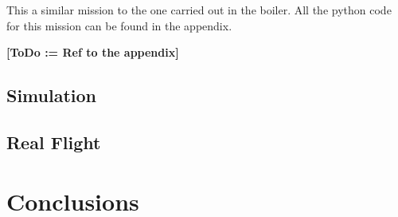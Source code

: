   This a similar mission to the one carried out in the boiler. All the python code for this mission can be found in the appendix.

  \textbf{[ToDo := Ref to the appendix]}

  \subsection{Simulation} \label{ch_5:subsect:exp_simulation}


  \subsection{Real Flight} \label{ch_5:subsect:exp_real_flight}

\section{Conclusions} \label{ch_5:sect:conclusions}

\begin{comment}
  \begin{itemize}
    \item Comment bullet
  \end{itemize}
\end{comment}
